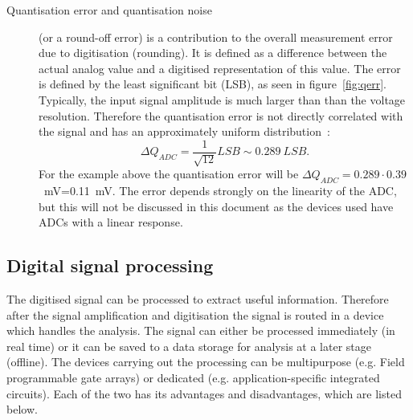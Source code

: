 \documentclass[12pt]{mytustyle}  %
\begin{document}
\begin{description}
\item[Quantisation error and quantisation noise] (or a round-off error) is a contribution to the overall measurement error due to digitisation (rounding). It is defined as a difference between the actual analog value and a digitised representation of this value. The error is defined by the least significant bit (LSB), as seen in figure~\ref{fig:qerr}. Typically, the input signal amplitude is much larger than than the voltage resolution. Therefore the quantisation error is not directly correlated with the signal and has an approximately uniform distribution~\cite{}: 
\begin{equation}
\label{eq:qerr}
\Delta Q_{ADC}=\frac{1}{\sqrt{12}}LSB\sim0.289~LSB.
\end{equation} 
For the example above the quantisation error will be $\Delta Q_{ADC}=0.289\cdot 0.39$~mV=0.11~mV. The error depends strongly on the linearity of the ADC, but this will not be discussed in this document as the devices used have ADCs with a linear response.
\end{description}

\subsection{Digital signal processing}
The digitised signal can be processed to extract useful information. Therefore after the signal amplification and digitisation the signal is routed in a device which handles the analysis. The signal can either be processed immediately (in real time) or it can be saved to a data storage for analysis at a later stage (offline). The devices carrying out the processing can be multipurpose (e.g. Field programmable gate arrays) or dedicated (e.g. application-specific integrated circuits). Each of the two has its advantages and disadvantages, which are listed below. 
\end{document}
